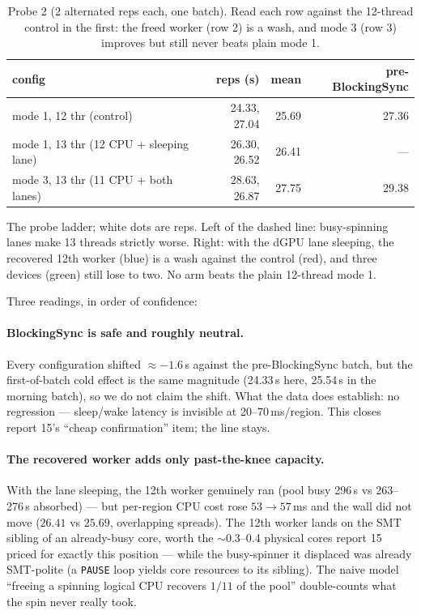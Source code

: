 \documentclass[
	english,
	letterpaper, oneside
]{article}
\begin{document}
\begin{table}[H]
\centering
\caption{Probe 2 (2 alternated reps each, one batch). Read each row against
the 12-thread control in the first: the freed worker (row 2) is a wash, and
mode 3 (row 3) improves but still never beats plain mode 1.\label{tab:probe2}}
\small
\begin{tabular}{lrrr}
\toprule
config & reps (s) & mean & pre-BlockingSync \\
\midrule
mode 1, 12 thr (control) & 24.33, 27.04 & 25.69 & 27.36 \\
mode 1, 13 thr (12 CPU + sleeping lane) & 26.30, 26.52 & 26.41 & --- \\
mode 3, 13 thr (11 CPU + both lanes) & 28.63, 26.87 & 27.75 & 29.38 \\
\bottomrule
\end{tabular}
\end{table}

            {The probe ladder; white dots are reps. Left of the dashed line:
             busy-spinning lanes make 13 threads strictly worse. Right: with
             the dGPU lane sleeping, the recovered 12th worker (blue) is a
             wash against the control (red), and three devices (green)
             still lose to two. No arm beats the plain 12-thread mode 1.
             \label{fig:probes}}

Three readings, in order of confidence:

\paragraph{BlockingSync is safe and roughly neutral.} Every configuration
shifted $\approx-1.6$\,s against the pre-BlockingSync batch, but the
first-of-batch cold effect is the same magnitude (24.33\,s here, 25.54\,s in
the morning batch), so we do not claim the shift. What the data does
establish: no regression --- sleep/wake latency is invisible at
20--70\,ms/region. This closes report 15's ``cheap confirmation'' item; the
line stays.

\paragraph{The recovered worker adds only past-the-knee capacity.} With the
lane sleeping, the 12th worker genuinely ran (pool busy 296\,s vs 263--276\,s
absorbed) --- but per-region CPU cost rose $53\to57$\,ms and the wall did not
move ($26.41$ vs $25.69$, overlapping spreads). The 12th worker lands on the
SMT sibling of an already-busy core, worth the $\sim$0.3--0.4 physical cores
report 15 priced for exactly this position --- while the busy-spinner it
displaced was already SMT-polite (a \texttt{PAUSE} loop yields core
resources to its sibling). The naive model ``freeing a spinning logical CPU
recovers $1/11$ of the pool'' double-counts what the spin never really took.
\end{document}
